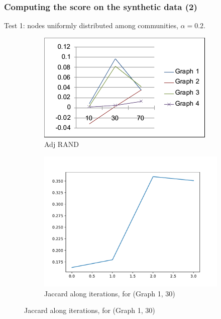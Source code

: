 \documentclass{beamer}
\begin{document}
\begin{frame}[c]
	\frametitle{Computing the score on the synthetic data (2)}
    Test 1: nodes uniformly distributed among communities, $\alpha = 0.2$.

        \begin{figure}
        \begin{center}
            \begin{subfigure}[b]{0.4\textwidth}
                \centering
                \includegraphics[width=\textwidth]{img/model_1run.png}
                \caption{Adj RAND}
                \label{fig:img/model_1run.png}
            \end{subfigure}
            \begin{subfigure}[b]{0.4\textwidth}
                \centering
                \includegraphics[width=\textwidth]{out/synthetic1/model1_scores1_40.pdf}
                \caption{Jaccard along iterations, for (Graph 1, 30)}
                \label{fig:}
            \end{subfigure}
        \end{center}
        \end{figure}
        
\end{frame}
\end{document}
